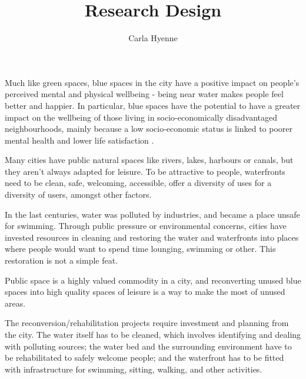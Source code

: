 \documentclass{article}
\title{Research Design}
\author{Carla Hyenne}
\date{}
\begin{document}
\maketitle


Much like green spaces, blue spaces in the city have a positive impact on people's perceived mental and physical wellbeing - being near water makes people feel better and happier.
In particular, blue spaces have the potential to have a greater impact on the wellbeing of those living in socio-economically disadvantaged neighbourhoods, mainly because a low socio-economic status is linked to poorer mental health and lower life satisfaction \parencite{van2021urban}.


Many cities have public natural spaces like rivers, lakes, harbours or canals, but they aren't always adapted for leisure. To be attractive to people, waterfronts need to be clean, safe, welcoming, accessible, offer a diversity of uses for a diversity of users, amongst other factors. 

In the last centuries, water was polluted by industries, and became a place unsafe for swimming. Through public pressure or environmental concerns, cities have invested resources in cleaning and restoring the water and waterfronts into places where people would want to spend time lounging, swimming or other. This restoration is not a simple feat. 

Public space is a highly valued commodity in a city, and reconverting unused blue spaces into high quality spaces of leisure is a way to make the most of unused areas.


The reconversion/rehabilitation projects require investment and planning from the city. The water itself has to be cleaned, which involves identifying and dealing with polluting sources; the water bed and the surrounding environment have to be rehabilitated to safely welcome people; and the waterfront has to be fitted with infrastructure for swimming, sitting, walking, and other activities.
\end{document}
